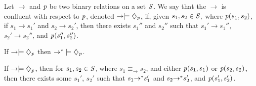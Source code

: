 \documentclass[numbers]{sigplanconf}
\begin{document}
\begin{definition}
  Let $\rightarrow$ and $\mathit{p}$ be two binary relations on a set $\mathit{S}$.
  We say that the $\rightarrow$ is confluent with respect to
  $\mathit{p}$, denoted
  $\rightarrow\models\diamondsuit_{\mathit{p}}$, if, given $s_1,s_2\in\mathit{S}$,
  where $\mathit{p}(s_1,s_2)$, if $s_1\rightarrow s_1'$ and
  $s_2 \rightarrow s_2'$, then there exists $s_1''$ and $s_2''$ such that
  $s_1'\rightarrow s_1''$, $s_2' \rightarrow s_2''$, and
  $\mathit{p}(s_1'',s_2'')$.
\end{definition}

\begin{theorem}
  If $\rightarrow\models\diamondsuit_{\mathit{p}}$ then
  ${\rightarrow}^*\models\diamondsuit_{\mathit{p}}$.
\end{theorem}

\begin{theorem}
  If $\rightarrow\models\diamondsuit_{\mathit{p}}$,
  then for $s_1,s_2\in\mathit{S}$, where
  $s_1\equiv_{\rightarrow}s_2$, and either $\mathit{p}(s_1,s_1)$ or
  $\mathit{p}(s_2,s_2)$, then there exists some $s_1'$, $s_2'$ such that $s_1
  {\rightarrow}^* s_1'$ and $s_2 {\rightarrow}^* s_2'$, and
  $\mathit{p}(s_1',s_2')$.
\end{theorem}
\end{document}
